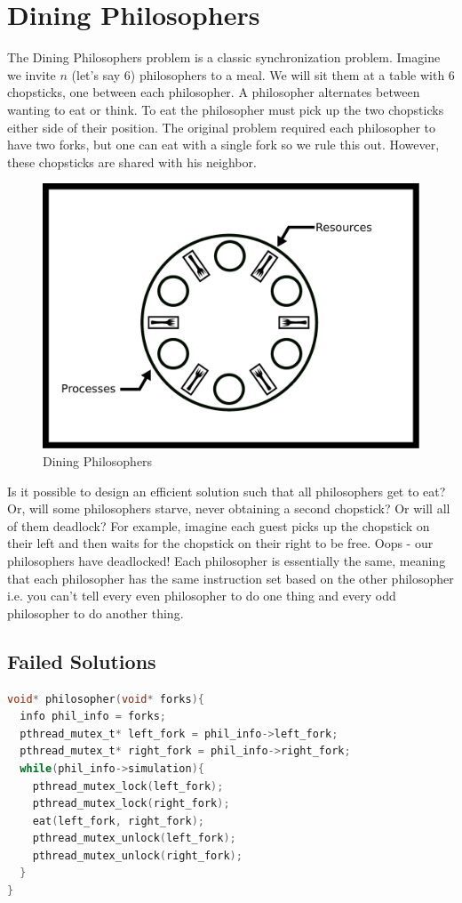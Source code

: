 \section{Dining Philosophers}

The Dining Philosophers problem is a classic synchronization problem.
Imagine we invite $n$ (let's say 6) philosophers to a meal.
We will sit them at a table with 6 chopsticks, one between each philosopher.
A philosopher alternates between wanting to eat or think.
To eat the philosopher must pick up the two chopsticks either side of their position.
The original problem required each philosopher to have two forks, but one can eat with a single fork so we rule this out.
However, these chopsticks are shared with his neighbor.

\begin{figure}[H]
	\centering
	\includegraphics[width=.5\textwidth]{deadlock/drawings/dining.eps}
	\caption{Dining Philosophers}
\end{figure}

Is it possible to design an efficient solution such that all philosophers get to eat?
Or, will some philosophers starve, never obtaining a second chopstick?
Or will all of them deadlock?
For example, imagine each guest picks up the chopstick on their left and then waits for the chopstick on their right to be free.
Oops - our philosophers have deadlocked!
Each philosopher is essentially the same, meaning that each philosopher has the same instruction set based on the other philosopher i.e. you can't tell every even philosopher to do one thing and every odd philosopher to do another thing.

\subsection{Failed Solutions}

\begin{lstlisting}[language=C]
void* philosopher(void* forks){
  info phil_info = forks;
  pthread_mutex_t* left_fork = phil_info->left_fork;
  pthread_mutex_t* right_fork = phil_info->right_fork;
  while(phil_info->simulation){
    pthread_mutex_lock(left_fork);
    pthread_mutex_lock(right_fork);
    eat(left_fork, right_fork);
    pthread_mutex_unlock(left_fork);
    pthread_mutex_unlock(right_fork);
  }
}
\end{lstlisting}

